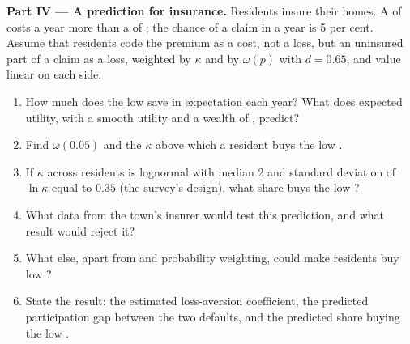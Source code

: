 \begin{problem}
\medskip
\noindent\textbf{Part IV --- A prediction for insurance.} Residents insure their homes. A  of
 costs  a year more than a  of ; the chance of a claim in a year is
5 per cent. Assume that residents code the premium as a cost, not a loss, but an uninsured part of a
claim as a loss, weighted by $\kappa$ and by $\omega(p)$ with $d = 0.65$, and value linear on each side.
\begin{enumerate}[resume]
  \item How much does the low  save in expectation each year? What does expected utility, with
        a smooth utility and a wealth of , predict?
  \item Find $\omega(0.05)$ and the $\kappa$ above which a resident buys the low .
  \item If $\kappa$ across residents is lognormal with median 2 and standard deviation of $\ln\kappa$
        equal to $0.35$ (the survey's design), what share buys the low ?
  \item What data from the town's insurer would test this prediction, and what result would reject it?
  \item What else, apart from  and probability weighting, could make residents buy low
        ?
  \item State the result: the estimated loss-aversion coefficient, the predicted participation gap
        between the two defaults, and the predicted share buying the low .
\end{enumerate}
\end{problem}
